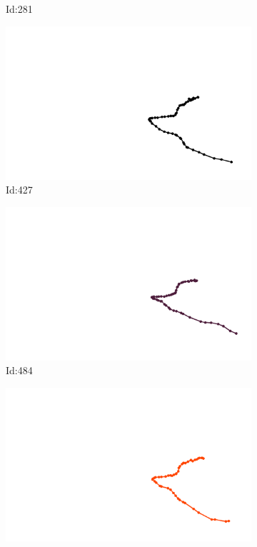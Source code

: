 \documentclass[12pt,twoside]{report}
\begin{document}
\begin{figure}
\begin{subfigure}[b]{0.20\textwidth}
\caption{Id:281}
\end{subfigure}
\begin{subfigure}[b]{0.20\textwidth}
\centering
\includegraphics[width=\textwidth]{../../trajectories/427.png}
\caption{Id:427}
\end{subfigure}
\begin{subfigure}[b]{0.20\textwidth}
\centering
\includegraphics[width=\textwidth]{../../trajectories/484.png}
\caption{Id:484}
\end{subfigure}
\begin{subfigure}[b]{0.20\textwidth}
\centering
\includegraphics[width=\textwidth]{../../trajectories/625.png}

\end{subfigure}
\end{figure}
\end{document}
